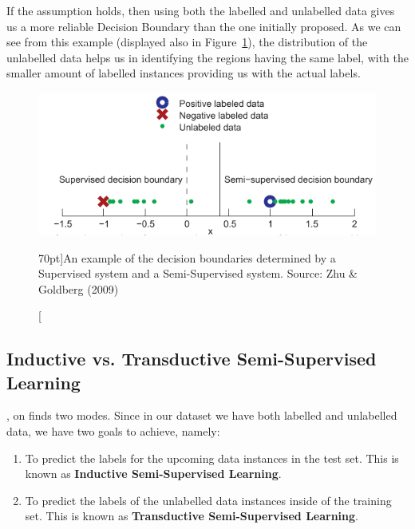 If the assumption holds, then using both the labelled and unlabelled data gives us a more reliable Decision Boundary than the one initially proposed. As we can see from this example (displayed also in Figure~\ref{fig:super_vs_semi}), the distribution of the unlabelled data helps us in identifying the regions having the same label, with the smaller amount of labelled instances providing us with the actual labels.

\begin{figure}
\includegraphics[scale=1]{"graphics/semi-supervised learning/supervised_vs_semi"}
\caption[Supervised vs Semi-Supervised Example][70pt]{An example of the decision boundaries determined by a Supervised system and a Semi-Supervised system.  Source: Zhu \& Goldberg (2009)}
\label{fig:super_vs_semi}
\end{figure}

\subsection{Inductive vs. Transductive Semi-Supervised Learning}\label{sec:inductive_transductive}

, on finds two modes. Since in our dataset we have both labelled and unlabelled data, we have two goals to achieve, namely:

\begin{enumerate}
\item To predict the labels for the upcoming data instances in the test set. This is known as \textbf{Inductive Semi-Supervised Learning}.
\item To predict the labels of the unlabelled data instances inside of the training set. This is known as \textbf{Transductive Semi-Supervised Learning}.
\end{enumerate}

